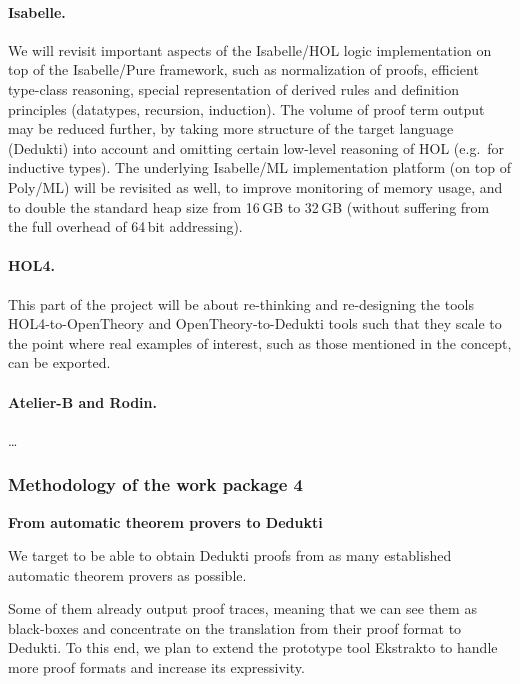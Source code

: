 \paragraph{Isabelle.}
We will revisit important aspects of the Isabelle/HOL logic
implementation on top of the Isabelle/Pure framework, such as
normalization of proofs, efficient type-class reasoning, special
representation of derived rules and definition principles (datatypes,
recursion, induction). The volume of proof term output may be reduced
further, by taking more structure of the target language (Dedukti)
into account and omitting certain low-level reasoning of HOL (e.g.\
for inductive types).
The underlying Isabelle/ML implementation platform (on top of Poly/ML)
will be revisited as well, to improve monitoring of memory usage, and
to double the standard heap size from 16\,GB to 32\,GB (without
suffering from the full overhead of 64\,bit addressing).

\paragraph{HOL4.}
This part of the project will be about re-thinking and re-designing
the tools HOL4-to-OpenTheory and OpenTheory-to-Dedukti tools such that
they scale to the point where real examples of interest, such as those
mentioned in the concept, can be exported.


\paragraph{Atelier-B and Rodin.} \ldots



\subsubsection{Methodology of the work package 4}

{\bf \large From automatic theorem provers to Dedukti}

We target to be able to obtain Dedukti proofs from as many established
automatic theorem provers as possible.

Some of them already output proof traces, meaning that we can see them
as black-boxes and concentrate on the translation from their proof format
to Dedukti. To this end, we plan to extend the prototype tool Ekstrakto
to handle more proof formats and increase its expressivity.

